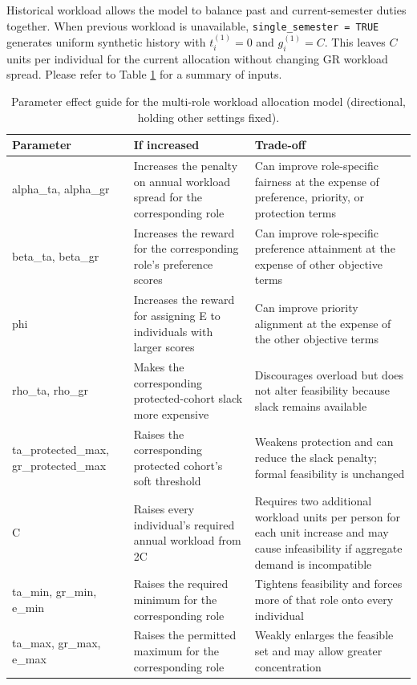 Historical workload allows the model to balance past and current-semester
duties together. When previous workload is unavailable,
\texttt{single\_semester\ =\ TRUE} generates uniform synthetic history with
\(t_i^{(1)}=0\) and \(g_i^{(1)}=C\). This leaves \(C\) units per individual for
the current allocation without changing GR workload spread. Please refer to
Table \ref{tab:multirole-param-guide} for a summary of inputs.

\begin{table}[!h]
\centering
\caption{\label{tab:multirole-param-guide}Parameter effect guide for the multi-role workload allocation model (directional, holding other settings fixed).}
\centering
\fontsize{9}{11}\selectfont
\begin{tabular}[t]{>{\raggedright\arraybackslash}p{3cm}>{\raggedright\arraybackslash}p{5cm}>{\raggedright\arraybackslash}p{5cm}}
\toprule
Parameter & If increased & Trade-off\\
\midrule
alpha\_ta, alpha\_gr & Increases the penalty on annual workload spread for the corresponding role & Can improve role-specific fairness at the expense of preference, priority, or protection terms\\
beta\_ta, beta\_gr & Increases the reward for the corresponding role's preference scores & Can improve role-specific preference attainment at the expense of other objective terms\\
phi & Increases the reward for assigning E to individuals with larger scores & Can improve priority alignment at the expense of the other objective terms\\
rho\_ta, rho\_gr & Makes the corresponding protected-cohort slack more expensive & Discourages overload but does not alter feasibility because slack remains available\\
ta\_protected\_max, gr\_protected\_max & Raises the corresponding protected cohort's soft threshold & Weakens protection and can reduce the slack penalty; formal feasibility is unchanged\\
\addlinespace
C & Raises every individual's required annual workload from 2C & Requires two additional workload units per person for each unit increase and may cause infeasibility if aggregate demand is incompatible\\
ta\_min, gr\_min, e\_min & Raises the required minimum for the corresponding role & Tightens feasibility and forces more of that role onto every individual\\
ta\_max, gr\_max, e\_max & Raises the permitted maximum for the corresponding role & Weakly enlarges the feasible set and may allow greater concentration\\
\bottomrule
\end{tabular}
\end{table}

